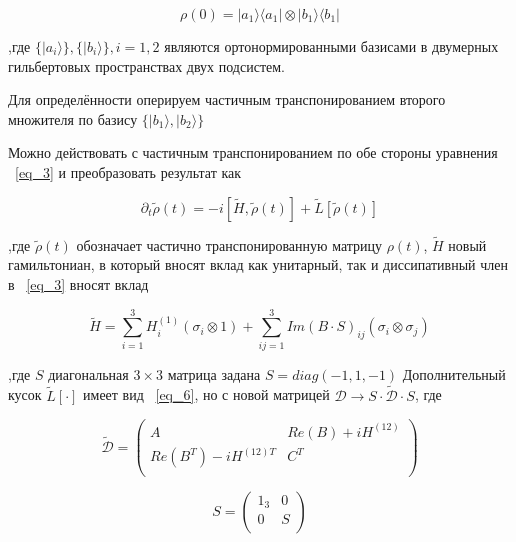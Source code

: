 \documentclass[11pt]{article}
\begin{document}
\begin{equation}
\rho(0)=|a_1\rangle \langle a_1| \otimes | b_1\rangle \langle b_1|
\label{eq_9}
\end{equation}

,где $\{ |a_i\rangle \}, \{ |b_i\rangle \}, i=1,2$  являются ортонормированными базисами в двумерных гильбертовых пространствах двух подсистем.

Для определённости оперируем частичным транспонированием второго множителя по базису $\{ |b_1\rangle , | b_2 \rangle \}$

Можно действовать с частичным транспонированием по обе стороны уравнения ~\ref{eq_3} и преобразовать результат как

\begin{equation}
\partial_t \tilde \rho (t) = -i[\tilde H, \tilde \rho(t)]+\tilde L [\tilde \rho (t)]
\label{eq_10}
\end{equation}

,где $\tilde \rho (t)$ обозначает частично транспонированную матрицу $\rho (t)$, $\tilde H$ новый гамильтониан, в который вносят вклад как унитарный, так и диссипативный член в ~\ref{eq_3} вносят вклад

\begin{equation}
\tilde H = \sum\limits_{i=1}^3 H_i^{(1)}(\sigma_i \otimes 1) + \sum\limits_{ij=1}^3Im(B \cdot S)_{ij}(\sigma_i \otimes \sigma_j)
\label{eq_12}
\end{equation}

,где $S$ диагональная $3 \times 3$ матрица задана $S=diag(-1, 1, -1)$
Дополнительный кусок $\tilde{L}[\cdot]$ имеет вид ~\ref{eq_6}, но с новой матрицей $\mathscr{D} \rightarrow S \cdot \tilde{\mathscr{D}} \cdot S$, где

\begin{equation}
\tilde{\mathscr{D}} = \left(
\begin{array}{cc}
A & Re(B) + iH^{(12)}\\
Re(B^T)-iH^{(12)T} & C^{T}\\
\end{array}
\right)
\label{eq_12}
\end{equation}

\begin{equation}
S = \left(
\begin{array}{cc}
1_3 & 0 \\
0 & S \\
\end{array}
\right)
\label{eq_13}
\end{equation}
\end{document}
